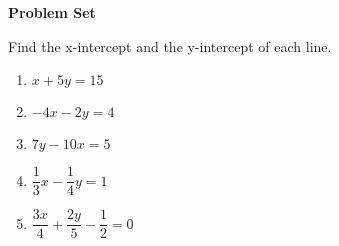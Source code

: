 \textbf{Problem Set}

\vspce

Find the x-intercept and the y-intercept of each line. 
\begin{enumerate}[label = \arabic*. ]
\item \hspce $x+5y=15$
\item \hspce $-4x-2y=4$
\item \hspce $7y-10x=5$
\item \hspce $\dfrac{1}{3}x- \dfrac{1}{4}y=1$
\item \hspce $\dfrac{3x}{4}+ \dfrac{2y}{5}-\dfrac{1}{2} =0$  
\end{enumerate}  
